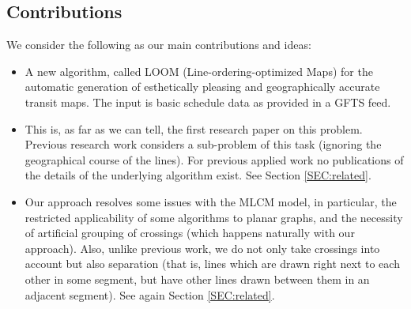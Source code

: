 \documentclass{llncs}
\begin{document}


\subsection{Contributions}\label{SEC:intro:contrib}

We consider the following as our main contributions and ideas:

\vspace{0mm}
\begin{itemize}[parsep=0.5mm,leftmargin=0mm,itemindent=4mm]
\renewcommand\labelitemi{$\bullet$}

\item A new algorithm, called LOOM (Line-ordering-optimized Maps) for the automatic generation of esthetically pleasing and geographically accurate transit maps. The input is basic schedule data as provided in a GFTS feed.

\item This is, as far as we can tell, the first research paper on this problem. Previous research work considers a sub-problem of this task (ignoring the geographical course of the lines). For previous applied work no publications of the details of the underlying algorithm exist. See Section \ref{SEC:related}.

\item Our approach resolves some issues with the MLCM model, in particular, the restricted applicability of some algorithms to planar graphs, and the necessity of artificial grouping of crossings (which happens naturally with our approach).
Also, unlike previous work, we do not only take crossings into account but also separation (that is, lines which are drawn right next to each other in some segment, but have other lines drawn between them in an adjacent segment).
See again Section \ref{SEC:related}.



\end{itemize}
\end{document}
